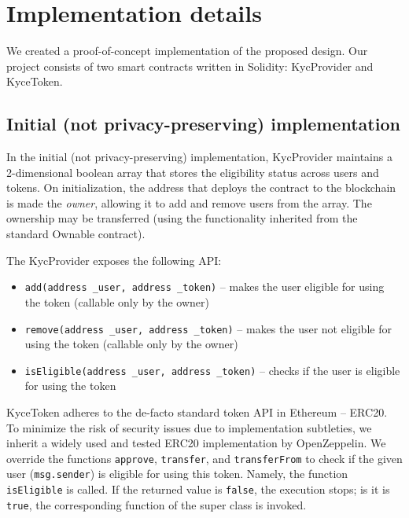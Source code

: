 
\section{Implementation details}

We created a proof-of-concept implementation of the proposed design.
Our project consists of two smart contracts written in Solidity: KycProvider and KyceToken.

\subsection{Initial (not privacy-preserving) implementation}
In the initial (not privacy-preserving) implementation, KycProvider maintains a 2-dimensional boolean array that stores the eligibility status across users and tokens.
On initialization, the address that deploys the contract to the blockchain is made the \textit{owner}, allowing it to add and remove users from the array.
The ownership may be transferred (using the functionality inherited from the standard Ownable contract).

The KycProvider exposes the following API:

\begin{itemize}
	\item \texttt{add(address \_user, address \_token)} -- makes the user eligible for using the token (callable only by the owner)
	\item \texttt{remove(address \_user, address \_token)} -- makes the user not eligible for using the token (callable only by the owner)
	\item \texttt{isEligible(address \_user, address \_token)} -- checks if the user is eligible for using the token
\end{itemize}

KyceToken adheres to the de-facto standard token API in Ethereum -- ERC20.
To minimize the risk of security issues due to implementation subtleties, we inherit a widely used and tested ERC20 implementation by OpenZeppelin.
We override the functions \texttt{approve}, \texttt{transfer}, and \texttt{transferFrom} to check if the given user (\texttt{msg.sender}) is eligible for using this token.
Namely, the function \texttt{isEligible} is called.
If the returned value is \texttt{false}, the execution stops; is it is \texttt{true}, the corresponding function of the super class is invoked.

